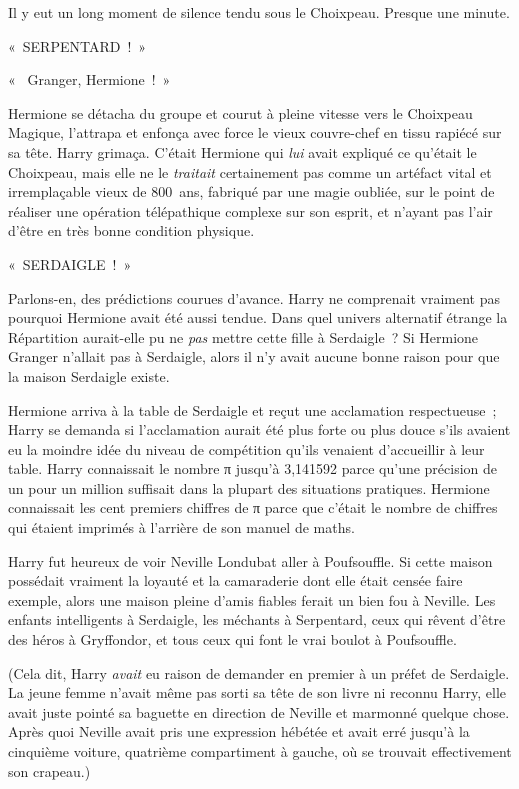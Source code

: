 Il y eut un long moment de silence tendu sous le Choixpeau. Presque une minute.

«~SERPENTARD~!~»

«~ Granger, Hermione~!~»

Hermione se détacha du groupe et courut à pleine vitesse vers le Choixpeau Magique, l'attrapa et enfonça avec force le vieux couvre-chef en tissu rapiécé sur sa tête.
Harry grimaça.
C'était Hermione qui \emph{lui} avait expliqué ce qu'était le Choixpeau, mais elle ne le \emph{traitait} certainement pas comme un artéfact vital et irremplaçable vieux de 800~ans, fabriqué par une magie oubliée, sur le point de réaliser une opération télépathique complexe sur son esprit, et n'ayant pas l'air d'être en très bonne condition physique.

«~SERDAIGLE~!~»

Parlons-en, des prédictions courues d'avance.
Harry ne comprenait vraiment pas pourquoi Hermione avait été aussi tendue.
Dans quel univers alternatif étrange la Répartition aurait-elle pu ne \emph{pas} mettre cette fille à Serdaigle~?
Si Hermione Granger n'allait pas à Serdaigle, alors il n'y avait aucune bonne raison pour que la maison Serdaigle existe.

Hermione arriva à la table de Serdaigle et reçut une acclamation respectueuse~;
Harry se demanda si l'acclamation aurait été plus forte ou plus douce s'ils avaient eu la moindre idée du niveau de compétition qu'ils venaient d'accueillir à leur table.
Harry connaissait le nombre π jusqu'à 3,141592 parce qu'une précision de un pour un million suffisait dans la plupart des situations pratiques.
Hermione connaissait les cent premiers chiffres de π parce que c'était le nombre de chiffres qui étaient imprimés à l'arrière de son manuel de maths.

Harry fut heureux de voir Neville Londubat aller à Poufsouffle.
Si cette maison possédait vraiment la loyauté et la camaraderie dont elle était censée faire exemple, alors une maison pleine d'amis fiables ferait un bien fou à Neville.
Les enfants intelligents à Serdaigle, les méchants à Serpentard, ceux qui rêvent d'être des héros à Gryffondor, et tous ceux qui font le vrai boulot à Poufsouffle.

(Cela dit, Harry \emph{avait} eu raison de demander en premier à un préfet de Serdaigle.
La jeune femme n'avait même pas sorti sa tête de son livre ni reconnu Harry, elle avait juste pointé sa baguette en direction de Neville et marmonné quelque chose.
Après quoi Neville avait pris une expression hébétée et avait erré jusqu'à la cinquième voiture, quatrième compartiment à gauche, où se trouvait effectivement son crapeau.)

